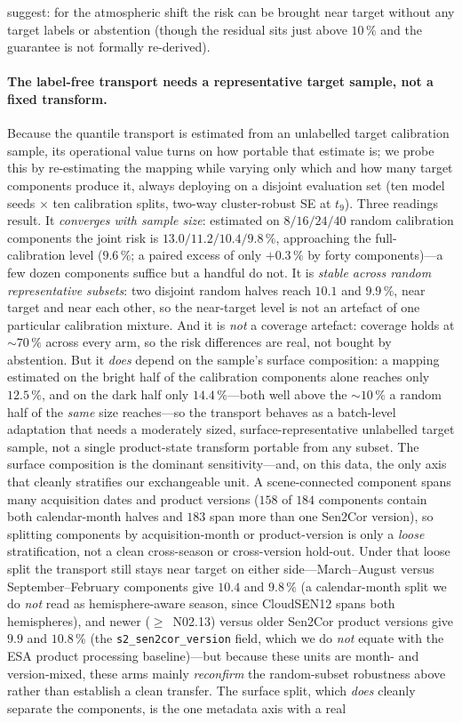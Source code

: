 \documentclass[preprint,3p,times]{elsarticle}
\begin{document}
suggest: for the atmospheric shift the risk can be brought near target without any target labels or abstention (though the residual sits just above $10\,\%$ and the guarantee is not formally re-derived).

\paragraph{The label-free transport needs a representative target sample, not a fixed transform.}\label{par:renormgen} Because the quantile transport is estimated from an unlabelled target calibration sample, its operational value turns on how portable that estimate is; we probe this by re-estimating the mapping while varying only which and how many target components produce it, always deploying on a disjoint evaluation set (ten model seeds $\times$ ten calibration splits, two-way cluster-robust SE at $t_9$). Three readings result. It \emph{converges with sample size}: estimated on $8/16/24/40$ random calibration components the joint risk is $13.0/11.2/10.4/9.8\,\%$, approaching the full-calibration level ($9.6\,\%$; a paired excess of only $+0.3\,\%$ by forty components)---a few dozen components suffice but a handful do not. It is \emph{stable across random representative subsets}: two disjoint random halves reach $10.1$ and $9.9\,\%$, near target and near each other, so the near-target level is not an artefact of one particular calibration mixture. And it is \emph{not} a coverage artefact: coverage holds at ${\sim}70\,\%$ across every arm, so the risk differences are real, not bought by abstention. But it \emph{does} depend on the sample's surface composition: a mapping estimated on the bright half of the calibration components alone reaches only $12.5\,\%$, and on the dark half only $14.4\,\%$---both well above the ${\sim}10\,\%$ a random half of the \emph{same} size reaches---so the transport behaves as a batch-level adaptation that needs a moderately sized, surface-representative unlabelled target sample, not a single product-state transform portable from any subset. The surface composition is the dominant sensitivity---and, on this data, the only axis that cleanly stratifies our exchangeable unit. A scene-connected component spans many acquisition dates and product versions ($158$ of $184$ components contain both calendar-month halves and $183$ span more than one Sen2Cor version), so splitting components by acquisition-month or product-version is only a \emph{loose} stratification, not a clean cross-season or cross-version hold-out. Under that loose split the transport still stays near target on either side---March--August versus September--February components give $10.4$ and $9.8\,\%$ (a calendar-month split we do \emph{not} read as hemisphere-aware season, since CloudSEN12 spans both hemispheres), and newer (${\geq}$~N02.13) versus older Sen2Cor product versions give $9.9$ and $10.8\,\%$ (the \texttt{s2\_sen2cor\_version} field, which we do \emph{not} equate with the ESA product processing baseline)---but because these units are month- and version-mixed, these arms mainly \emph{reconfirm} the random-subset robustness above rather than establish a clean transfer. The surface split, which \emph{does} cleanly separate the components, is the one metadata axis with a real 
\end{document}
